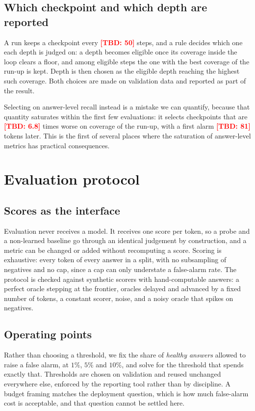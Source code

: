 \documentclass{article}
\newcommand{\TBD}[1]{\textcolor{red}{\textbf{[TBD: #1]}}}
\begin{document}
\subsection{Which checkpoint and which depth are reported}
\label{sec:selection-rule}
A run keeps a checkpoint every \TBD{50} steps, and a rule decides which one each
depth is judged on: a depth becomes eligible once its coverage inside the loop
clears a floor, and among eligible steps the one with the best coverage of the
run-up is kept. Depth is then chosen as the eligible depth reaching the highest
such coverage. Both choices are made on validation data and reported as part of
the result.

Selecting on answer-level recall instead is a mistake we can quantify, because
that quantity saturates within the first few evaluations: it selects checkpoints
that are \TBD{6.8} times worse on coverage of the run-up, with a first alarm
\TBD{81} tokens later. This is the first of several places where the saturation
of answer-level metrics has practical consequences.

\section{Evaluation protocol}
\label{sec:protocol}

\subsection{Scores as the interface}
Evaluation never receives a model. It receives one score per token, so a probe
and a non-learned baseline go through an identical judgement by construction, and
a metric can be changed or added without recomputing a score. Scoring is
exhaustive: every token of every answer in a split, with no subsampling of
negatives and no cap, since a cap can only understate a false-alarm rate. The
protocol is checked against synthetic scorers with hand-computable answers: a
perfect oracle stepping at the frontier, oracles delayed and advanced by a fixed
number of tokens, a constant scorer, noise, and a noisy oracle that spikes on
negatives.

\subsection{Operating points}
Rather than choosing a threshold, we fix the share of \emph{healthy answers}
allowed to raise a false alarm, at $1\%$, $5\%$ and $10\%$, and solve for the
threshold that spends exactly that. Thresholds are chosen on validation and
reused unchanged everywhere else, enforced by the reporting tool rather than by
discipline. A budget framing matches the deployment question, which is how much
false-alarm cost is acceptable, and that question cannot be settled here.
\end{document}
